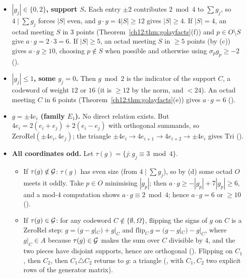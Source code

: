 \begin{itemize}
\item \textbf{$|g_j|\in\{0,2\}$, support $S$.}  Each entry $\pm2$ contributes $2\bmod4$ to $\sum g_j$, so
  $4\mid\sum g_j$ forces $|S|$ even, and $g\cdot g=4|S|\ge12$ gives $|S|\ge4$.  If $|S|=4$, an octad meeting $S$
  in $3$ points (Theorem~\ref{ch12:thm:golayfacts}(f)) and $p\in O\setminus S$ give $a\cdot g=2\cdot3=6$.
  If $|S|\ge5$, an octad meeting $S$ in $\ge5$ points (by (c)) gives $a\cdot g\ge10$, choosing $p\notin S$
  when possible and otherwise using $\sigma_pg_p\ge-2$ ().
\item \textbf{$|g_j|\le1$, some $g_j=0$.}  Then $g\bmod2$ is the indicator of the support $C$, a codeword
  of weight $12$ or $16$ (it is $\ge12$ by the norm, and $<24$).  An octad meeting $C$ in $6$ points
  (Theorem~\ref{ch12:thm:golayfacts}(e)) gives $a\cdot g=6$ ().
\item \textbf{$g=\pm4e_i$ (family $E_1$).}  No direct relation exists.  But
  $4e_i = 2(e_i+e_j)+2(e_i-e_j)$ with orthogonal summands, so $\mathrm{ZeroRel}(\pm4e_i,4e_j)$; the
  triangle $\pm4e_i\to4e_{i+1}\to4e_{i+2}\to\pm4e_i$ gives $\mathrm{Tri}$ ().
\item \textbf{All coordinates odd.}  Let $\tau(g)=\{j:g_j\equiv3\bmod4\}$.
  \begin{itemize}
  \item If $\tau(g)\notin\mathcal{G}$: $\tau(g)$ has even size (from $4\mid\sum g_j$), so by (d) some octad $O$
    meets it oddly.  Take $p\in O$ minimising $|g_p|$; then $a\cdot g\ge -|g_p|+7|g_p|\ge6$, and a mod-$4$
    computation shows $a\cdot g\equiv2\bmod4$; hence $a\cdot g=6$ or $\ge10$ ().
  \item If $\tau(g)\in\mathcal{G}$: for any codeword $C\notin\{\emptyset,\Omega\}$, flipping the signs of $g$ on
    $C$ is a $\mathrm{ZeroRel}$ step: $g=(g-g|_C)+g|_C$ and $\mathrm{flip}_C\,g=(g-g|_C)-g|_C$, where $g|_C\in
    A$ because $\tau(g)\in\mathcal{G}$ makes the sum over $C$ divisible by $4$, and the two pieces have disjoint
    supports, hence are orthogonal ().  Flipping on $C_1$, then $C_2$, then $C_1\triangle
    C_2$ returns to $g$: a triangle (, with $C_1,C_2$ two explicit rows of the generator
    matrix).
  \end{itemize}
\end{itemize}

